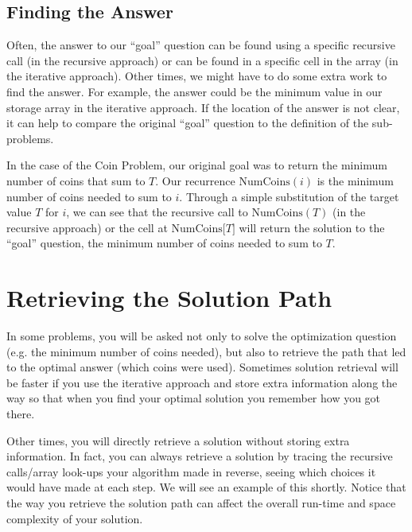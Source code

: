 \documentclass[11pt]{article}
\begin{document}

\subsection*{Finding the Answer}
Often, the answer to our ``goal'' question can be found using a specific recursive call (in the recursive approach) or can be found in a specific cell in the array (in the iterative approach). Other times, we might have to do some extra work to find the answer. For example, the answer could be the minimum value in our storage array in the iterative approach. If the location of the answer is not clear, it can help to compare the original ``goal'' question to the definition of the sub-problems.

In the case of the Coin Problem, our original goal was to return the minimum number of coins that sum to $T$. Our recurrence $\mathrm{NumCoins}(i)$ is the minimum number of coins needed to sum to $i$. Through a simple substitution of the target value $T$ for $i$, we can see that the recursive call to $\mathrm{NumCoins}(T)$ (in the recursive approach) or the cell at $\mathrm{NumCoins} \lbrack T \rbrack $ will return the solution to the ``goal'' question, the minimum number of coins needed to sum to $T$.

\section{Retrieving the Solution Path}
In some problems, you will be asked not only to solve the optimization question (e.g. the minimum number of coins needed), but also to retrieve the path that led to the optimal answer (which coins were used). Sometimes solution retrieval will be faster if you use the iterative approach and store extra information along the way so that when you find your optimal solution you remember how you got there. 

Other times, you will directly retrieve a solution without storing extra information. In fact, you can always retrieve a solution by tracing the recursive calls/array look-ups your algorithm made in reverse, seeing which choices it would have made at each step. We will see an example of this shortly. Notice that the way you retrieve the solution path can affect the overall run-time and space complexity of your solution.
\end{document}
